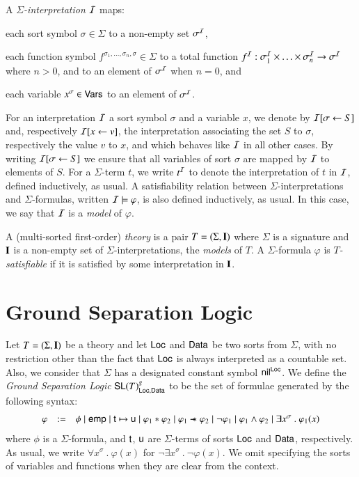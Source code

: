 \documentclass{llncs}
\begin{document}
A \emph{$\Sigma$-interpretation $\mathcal{I}$} maps:\begin{compactitem}
\item each sort symbol $\sigma \in \Sigma$ to a non-empty set $\sigma^{\mathcal{I}}$,
\item each function symbol $f^{\sigma_1,\ldots,\sigma_n,\sigma} \in \Sigma$ to a
  total function $f^{\mathcal{I}} : \sigma^{\mathcal{I}}_1 \times \ldots \times \sigma^{\mathcal{I}}_n
  \rightarrow \sigma^{\mathcal{I}}$ where $n > 0$, and to an element of $\sigma^{\mathcal{I}}$ when $n
  = 0$, and
\item each variable $x^\sigma \in \mathsf{Vars}$ to an element of $\sigma^{\mathcal{I}}$.
\end{compactitem}

For an interpretation $\mathcal{I}$ a sort symbol $\sigma$ and a variable $x$,
we denote by $\mathcal{I}[\sigma \leftarrow S]$ and, respectively $\mathcal{I}[x
  \leftarrow v]$, the interpretation associating the set $S$ to
$\sigma$, respectively the value $v$ to $x$, and which behaves like
$\mathcal{I}$ in all other cases. By writing $\mathcal{I}[\sigma \leftarrow S]$ we
ensure that all variables of sort $\sigma$ are mapped by $\mathcal{I}$ to
elements of $S$. For a $\Sigma$-term $t$, we write $t^{\mathcal{I}}$ to denote
the interpretation of $t$ in $\mathcal{I}$, defined inductively, as usual. A
satisfiability relation between $\Sigma$-interpretations and
$\Sigma$-formulas, written $\mathcal{I} \models \varphi$, is also defined
inductively, as usual. In this case, we say that $\mathcal{I}$ is a
\emph{model} of $\varphi$. 

A (multi-sorted first-order) \emph{theory} is a pair \(T = (\Sigma,
\mathbf{I})\) where $\Sigma$ is a signature and $\mathbf{I}$ is a non-empty set
of $\Sigma$-interpretations, the \emph{models} of $T$. A
$\Sigma$-formula $\varphi$ is \emph{$T$-satisfiable} if it is
satisfied by some interpretation in $\mathbf{I}$.

\section{Ground Separation Logic}

Let \(T = (\Sigma, \mathbf{I})\) be a theory and let $\mathsf{Loc}$ and $\mathsf{Data}$ be
two sorts from $\Sigma$, with no restriction other than the fact that
$\mathsf{Loc}$ is always interpreted as a countable set. Also, we consider
that $\Sigma$ has a designated constant symbol $\mathsf{nil}^{\mathsf{Loc}}$. We define
the \emph{Ground Separation Logic} $\mathsf{SL}(T)^g_{\mathsf{Loc},\mathsf{Data}}$ to
be the set of formulae generated by the following syntax:
\[\begin{array}{lcl}
\varphi & := & \phi \mid \mathsf{emp} \mid \mathsf{t} \mapsto \mathsf{u} \mid
\varphi_1 * \varphi_2 \mid \varphi_1 \mathrel{\mbox{$\hspace*{-0.03em}\mathord{-}\hspace*{-0.66em} \mathord{-}\hspace*{-0.36em}\mathord{*}$\hspace*{-0.005em}}} \varphi_2 \mid \neg
\varphi_1 \mid \varphi_1 \wedge \varphi_2 \mid \exists x^\sigma ~.~
\varphi_1(x)
\end{array}\]
where $\phi$ is a $\Sigma$-formula, and $\mathsf{t}$, $\mathsf{u}$ are
$\Sigma$-terms of sorts $\mathsf{Loc}$ and $\mathsf{Data}$, respectively. As usual,
we write $\forall x^\sigma ~.~ \varphi(x)$ for $\neg\exists x^\sigma
~.~ \neg\varphi(x)$. We omit specifying the sorts of variables and
functions when they are clear from the context.
\end{document}

